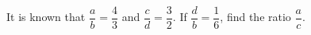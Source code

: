 It is known that $\dfrac{a}{b}=\dfrac{4}{3}$ and $\dfrac{c}{d}=\dfrac{3}{2}$. If $\dfrac{d}{b}=\dfrac{1}{6}$, find the ratio $\dfrac{a}{c}$.
